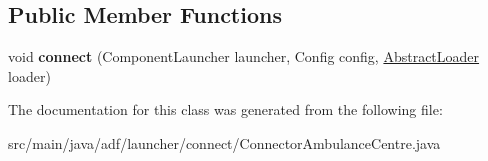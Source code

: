 \subsection*{Public Member Functions}
\begin{DoxyCompactItemize}
\item 
\hypertarget{classadf_1_1launcher_1_1connect_1_1ConnectorAmbulanceCentre_a82e17ab030924e8c0d2b53d030dc330e}{}\label{classadf_1_1launcher_1_1connect_1_1ConnectorAmbulanceCentre_a82e17ab030924e8c0d2b53d030dc330e} 
void {\bfseries connect} (Component\+Launcher launcher, Config config, \hyperlink{classadf_1_1component_1_1AbstractLoader}{Abstract\+Loader} loader)
\end{DoxyCompactItemize}


The documentation for this class was generated from the following file\+:\begin{DoxyCompactItemize}
\item 
src/main/java/adf/launcher/connect/Connector\+Ambulance\+Centre.\+java\end{DoxyCompactItemize}
